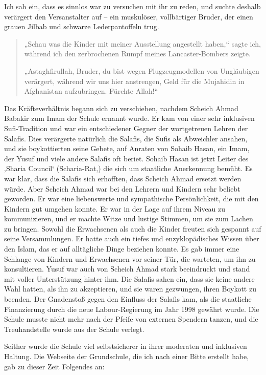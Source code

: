 \documentclass[12pt]{memoir}
\def\–{\hskip0pt-\hskip0pt}
\begin{document}
Ich sah ein, dass es sinnlos war zu versuchen mit ihr zu reden,
und suchte deshalb verärgert den Versanstalter auf –
ein muskulöser, vollbärtiger Bruder,
der einen grauen Jilbab und schwarze Lederpantoffeln trug.

\begin{quote}
„Schau was die Kinder mit meiner Ausstellung angestellt haben,“
sagte ich,
während ich den zerbrochenen Rumpf meines Lancaster\–Bombers zeigte.

„Astaghfirullah, Bruder,
du bist wegen Flugzeugmodellen von Ungläubigen verärgert,
während wir uns hier anstrengen,
Geld für die Mujahidin in Afghanistan aufzubringen.
Fürchte Allah!“
\end{quote}

Das Kräfteverhältnis begann sich zu verschieben,
nachdem Scheich Ahmad Babakir zum Imam der Schule ernannt wurde.
Er kam von einer sehr inklusiven Sufi\–Tradition
und war ein entschiedener Gegner der wortgetreuen Lehren der Salafis.
Dies verärgerte natürlich die Salafis, die Sufis als Abweichler ansahen,
und sie boykottierten seine Gebete, auf Anraten von Sohaib Hasan,
ein Imam, der Yusuf und viele andere Salafis oft beriet.
Sohaib Hasan ist jetzt Leiter des ‚Sharia Council‘ (Scharia\–Rat,)
die sich um staatliche Anerkennung bemüht.
Es war klar, dass die Salafis sich erhofften,
dass Scheich Ahmad ersetzt werden würde.
Aber Scheich Ahmad war bei den Lehrern und Kindern sehr beliebt geworden.
Er war eine liebenswerte und sympathische Persönlichkeit,
die mit den Kindern gut umgehen konnte.
Er war in der Lage auf ihrem Niveau zu kommunizieren,
und er machte Witze und lustige Stimmen, um sie zum Lachen zu bringen.
Sowohl die Erwachsenen als auch die Kinder
freuten sich gespannt auf seine Versammlungen.
Er hatte auch ein tiefes und enzyklopädisches Wissen über den Islam,
das er auf alltägliche Dinge beziehen konnte.
Es gab immer eine Schlange von Kindern und Erwachsenen vor seiner Tür,
die warteten, um ihn zu konsultieren.
Yusuf war auch von Scheich Ahmad stark beeindruckt
und stand mit voller Unterstützung hinter ihm.
Die Salafis sahen ein, dass sie keine andere Wahl hatten,
als ihn zu akzeptieren, und sie waren gezwungen, ihren Boykott zu beenden.
Der Gnadenstoß gegen den Einfluss der Salafis kam,
als die staatliche Finanzierung durch
die neue Labour\–Regierung im Jahr 1998 gewährt wurde.
Die Schule musste nicht mehr nach der Pfeife von externen Spendern tanzen,
und die Treuhandstelle wurde aus der Schule verlegt.

Seither wurde die Schule viel selbstsicherer
in ihrer moderaten und inklusiven Haltung.
Die Webseite der Grundschule, die ich nach einer Bitte erstellt habe,
gab zu dieser Zeit Folgendes an:
\end{document}
